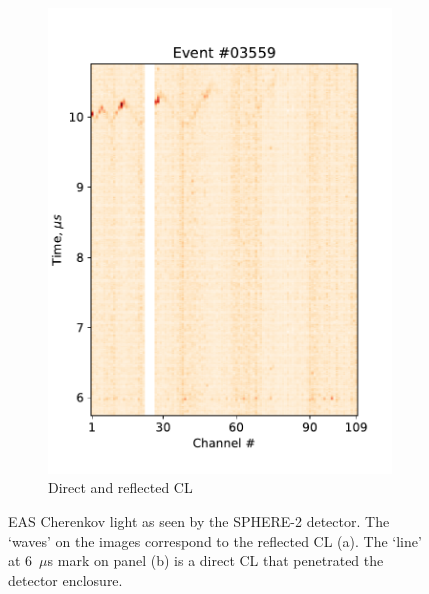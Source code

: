 \documentclass[a4paper,11pt]{article}
\begin{document}
\begin{figure}
\begin{minipage}{.67\textwidth}
\begin{subfigure}[t]{0.42\textwidth}
            \includegraphics[width=\textwidth]{hybrid-event-1}
            \caption{Direct and reflected CL}
            \label{fig:hybrid-1}
        \end{subfigure}
        \caption{EAS Cherenkov light as seen by the SPHERE-2 detector. The `waves' on the images correspond to the reflected CL (a). The `line' at 6~$\mu$s mark on panel (b) is a direct CL that penetrated the detector enclosure. %
        }
        \label{fig:foobar}
    \end{minipage}
\end{figure}
\end{document}
